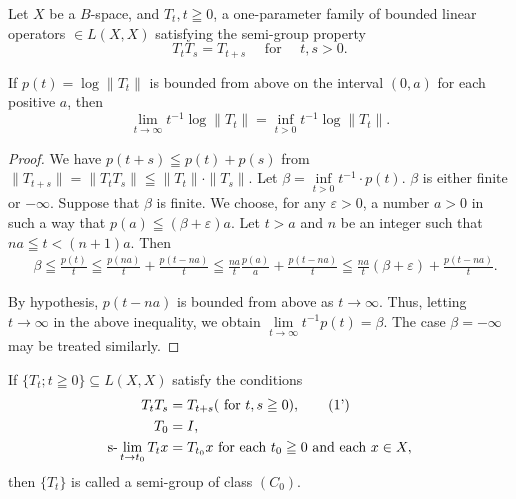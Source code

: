 \begin{propositionn} Let $X$ be a $B$-space, and $T_{t}, t \geqq 0$, a one-parameter family of bounded linear operators $\in L(X, X)$ satisfying the semi-group property
\begin{equation}\label{eq:IX.1.1}
T _{t} T _{s} = T _{t+s} \quad \text{ for } \quad t, s > 0.
\end{equation}

If $p(t) = \log \|T_t\|$ is bounded from above on the interval $(0, a)$ for each positive $a$, then 
\begin{equation}\label{eq:IX.1.2}
\lim\limits _{t \rightarrow \infty} t ^{-1} \log \| T _{t} \| = \inf\limits _{t>0} t ^{-1} \log \| T _{t} \|.
\end{equation}

\end{propositionn}
\begin{proof}
 We have $p(t + s) \leqq p(t) + p(s)$ from $\| T_{t+s} \| = \| T_t T_s \| \leqq \| T_t \| \cdot \| T_s \|$. Let $\beta = \inf\limits_{t>0} t^{-1} \cdot p(t)$. $\beta$ is either finite or $-\infty$. Suppose that $\beta$ is finite. We choose, for any $\varepsilon > 0$, a number $a > 0$ in such a way that $p(a) \leqq (\beta + \varepsilon)a$. Let $t > a$ and $n$ be an integer such that $na \leqq t < (n + 1)a$. Then 
\[
\begin{aligned}
&\beta \leqq \frac {p (t)}{t} \leqq \frac {p (n a)}{t} + \frac {p (t - n a)}{t} \leqq \frac {n a}{t} \frac {p (a)}{a} + \frac {p (t - n a)}{t} \leqq \frac {n a}{t} (\beta + \varepsilon) + \frac {p (t - n a)}{t}.
\end{aligned}
\]

By hypothesis, $p(t - na)$ is bounded from above as $t \to \infty$. Thus, letting $t \to \infty$ in the above inequality, we obtain $\lim\limits_{t \to \infty} t^{-1} p(t) = \beta$. The case $\beta = -\infty$ may be treated similarly. 
\end{proof}

\begin{definition}\label{def:IX.1.Definition.1} If $\{T_t; t \geqq 0\} \subseteq L(X, X)$ satisfy the conditions 
\begin{align}
T _{t} T _{s}& = T _{t+s} (\text{ for } t, s \geqq 0), \tag{1'}\label{eq:IX.1.1'} \\
T _{0}& = I, \label{eq:IX.1.3} \\
\text{s-}\lim _ {t \to t _{0}} T _{t} x& = T _ {t _{0}} x \text{ for each } t _{0} \geqq 0 \text{ and each } x \in X, \label{eq:IX.1.4}
\end{align}
then $\{T_t\}$ is called a semi-group of class $(C_0)$. 
\end{definition}


